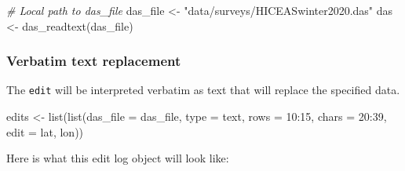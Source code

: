 \documentclass[
]{book}
\newenvironment{Shaded}{\begin{snugshade}}{\end{snugshade}}
\newcommand{\AttributeTok}[1]{\textcolor[rgb]{0.77,0.63,0.00}{#1}}
\newcommand{\CommentTok}[1]{\textcolor[rgb]{0.56,0.35,0.01}{\textit{#1}}}
\newcommand{\DecValTok}[1]{\textcolor[rgb]{0.00,0.00,0.81}{#1}}
\newcommand{\FunctionTok}[1]{\textcolor[rgb]{0.00,0.00,0.00}{#1}}
\newcommand{\NormalTok}[1]{#1}
\newcommand{\OtherTok}[1]{\textcolor[rgb]{0.56,0.35,0.01}{#1}}
\newcommand{\SpecialCharTok}[1]{\textcolor[rgb]{0.00,0.00,0.00}{#1}}
\newcommand{\StringTok}[1]{\textcolor[rgb]{0.31,0.60,0.02}{#1}}
\begin{document}
\begin{Shaded}
\begin{Highlighting}[]
\CommentTok{\# Local path to das\_file}
\NormalTok{das\_file }\OtherTok{\textless{}{-}} \StringTok{"data/surveys/HICEASwinter2020.das"}
\NormalTok{das }\OtherTok{\textless{}{-}} \FunctionTok{das\_readtext}\NormalTok{(das\_file)}
\end{Highlighting}
\end{Shaded}

\hypertarget{verbatim-text-replacement}{%
\subsubsection*{Verbatim text replacement}\label{verbatim-text-replacement}}

The \texttt{edit} will be interpreted verbatim as text that will replace the specified data.

\begin{Shaded}
\begin{Highlighting}[]
\NormalTok{edits }\OtherTok{\textless{}{-}} \FunctionTok{list}\NormalTok{(}\FunctionTok{list}\NormalTok{(}\AttributeTok{das\_file =}\NormalTok{ das\_file, }
                   \AttributeTok{type =} \StringTok{\textquotesingle{}text\textquotesingle{}}\NormalTok{,}
                   \AttributeTok{rows =} \DecValTok{10}\SpecialCharTok{:}\DecValTok{15}\NormalTok{, }
                   \AttributeTok{chars =} \DecValTok{20}\SpecialCharTok{:}\DecValTok{39}\NormalTok{, }
                   \AttributeTok{edit =} \StringTok{\textquotesingle{}lat, lon\textquotesingle{}}\NormalTok{))}
\end{Highlighting}
\end{Shaded}

Here is what this edit log object will look like:
\end{document}
